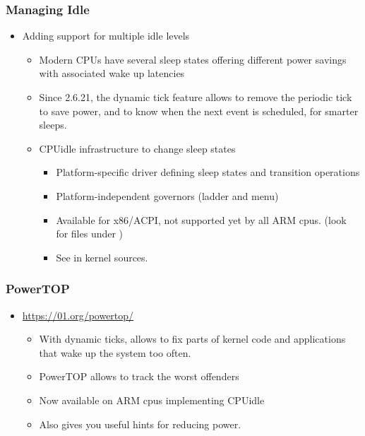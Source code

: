 \begin{frame}
  \frametitle{Managing Idle}
  \begin{itemize}
  \item Adding support for multiple idle levels
    \begin{itemize}
    \item Modern CPUs have several sleep states offering different
      power savings with associated wake up latencies
    \item Since 2.6.21, the dynamic tick feature allows to remove the
      periodic tick to save power, and to know when the next event is
      scheduled, for smarter sleeps.
    \item CPUidle infrastructure to change sleep states
      \begin{itemize}
      \item Platform-specific driver defining sleep states and
        transition operations
      \item Platform-independent governors (ladder and menu)
      \item Available for x86/ACPI, not supported yet by all ARM cpus.
        (look for  files under )
      \item See  in kernel sources.
      \end{itemize}
    \end{itemize}
  \end{itemize}
\end{frame}

\begin{frame}
  \frametitle{PowerTOP}
  \begin{itemize}
  \item \url{https://01.org/powertop/}
    \begin{itemize}
    \item With dynamic ticks, allows to fix parts of kernel code and
      applications that wake up the system too often.
    \item PowerTOP allows to track the worst offenders
    \item Now available on ARM cpus implementing CPUidle
    \item Also gives you useful hints for reducing power.
    \end{itemize}
  \end{itemize}
\end{frame}

